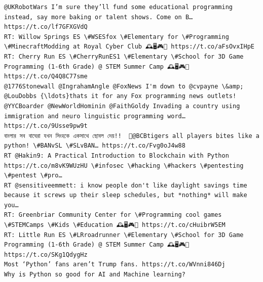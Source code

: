 \documentclass[11pt]{article}
\begin{document}
\begin{Verbatim}[commandchars=\\\{\}]
@UKRobotWars I’m sure they’ll fund some educational programming instead, say more baking or talent shows. Come on B… https://t.co/lf7GFXGVdQ
RT: Willow Springs ES \#WSESfox \#Elementary for \#Programming \#MinecraftModding at Royal Cyber Club 🕰️🖥️🎮💎 https://t.co/aFsOvxIHpE
RT: Cherry Run ES \#CherryRunES1 \#Elementary \#School for 3D Game Programming (1-6th Grade) @ STEM Summer Camp 🕰️🖥️🎮💎 https://t.co/Q4Q8C77sme
@1776Stonewall @IngrahamAngle @FoxNews I'm down to @cvpayne \&amp; @LouDobbs {\ldots}thats it for any Fox programming news outlets!
@YYCBoarder @NewWorldHominin @FaithGoldy Invading a country using immigration and neuro linguistic programming word… https://t.co/9Usse9pw9t
বাংলার সব বাঘেরা যখন সিংহকে একসাথে ছোবল দেয়!!  🐅@BCBtigers all players bites like a python! \#BANvSL \#SLvBAN… https://t.co/Fvg0oJ4w88
RT @Hakin9: A Practical Introduction to Blockchain with Python https://t.co/m8vK9WUzHU \#infosec \#hacking \#hackers \#pentesting \#pentest \#pro…
RT @sensitiveemmett: i know people don't like daylight savings time because it screws up their sleep schedules, but *nothing* will make you…
RT: Greenbriar Community Center for \#Programming cool games \#STEMCamps \#Kids \#Education 🕰️🖥️🎮💎 https://t.co/cHuibrW5EM
RT: Little Run ES \#LRroadrunner \#Elementary \#School for 3D Game Programming (1-6th Grade) @ STEM Summer Camp 🕰️🖥️🎮💎 https://t.co/SKg1QdygHz
Most ‘Python’ fans aren’t Trump fans. https://t.co/WVnni846Dj
Why is Python so good for AI and Machine learning?


\end{Verbatim}
\end{document}
